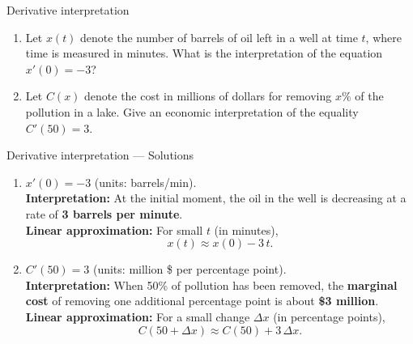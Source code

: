 \documentclass[9pt]{beamer}
\begin{document}
\begin{frame}{Derivative interpretation}

\begin{enumerate}[leftmargin = 0.5cm, label = \arabic*., rightmargin = 0.2cm]
    \item Let $x(t)$ denote the number of barrels of oil left in a well at time $t$, where time is measured in minutes. What is the interpretation of the equation $x'(0) = -3$?

    \item Let $C(x)$ denote the cost in millions of dollars for removing $x\%$ of the pollution in a lake. Give an economic interpretation of the equality $C'(50) = 3$.

\end{enumerate}
    
\end{frame}


\begin{frame}{Derivative interpretation — Solutions}

\small
\begin{enumerate}[leftmargin=0.5cm, label=\arabic*., rightmargin=0.2cm]

\item $x'(0)=-3$ (units: barrels/min). \\
\textbf{Interpretation:} At the initial moment, the oil in the well is decreasing at a rate of \textbf{3 barrels per minute}. \\
\textbf{Linear approximation:} For small $t$ (in minutes),
\[
x(t)\approx x(0) - 3\,t .
\]

\item $C'(50)=3$ (units: million \$ per percentage point). \\
\textbf{Interpretation:} When 50\% of pollution has been removed, the \textbf{marginal cost} of removing one additional percentage point is about \textbf{\$3 million}. \\
\textbf{Linear approximation:} For a small change $\Delta x$ (in percentage points),
\[
C(50+\Delta x)\approx C(50) + 3\,\Delta x .
\]

\end{enumerate}

\end{frame}
\end{document}
